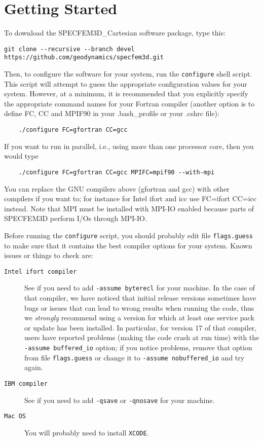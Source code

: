 \chapter{Getting Started}\label{cha:Getting-Started}

To download the SPECFEM3D\_Cartesian software package, type this:
\begin{verbatim}
git clone --recursive --branch devel https://github.com/geodynamics/specfem3d.git
\end{verbatim}
%

Then, to configure the software for your system, run the
\texttt{configure} shell script. This script will attempt to guess
the appropriate configuration values for your system. However, at
a minimum, it is recommended that you explicitly specify the appropriate
command names for your Fortran compiler (another option is to define FC, CC and MPIF90 in your .bash\_profile
or your .cshrc file):
%
\begin{verbatim}
    ./configure FC=gfortran CC=gcc
\end{verbatim}
%
If you want to run in parallel, i.e., using more than one processor core, then you would type
%
\begin{verbatim}
    ./configure FC=gfortran CC=gcc MPIFC=mpif90 --with-mpi
\end{verbatim}

You can replace the GNU compilers above (gfortran and gcc) with other compilers if you want to; for instance for Intel ifort and icc use FC=ifort CC=icc instead. Note that MPI must be installed with MPI-IO enabled because parts of SPECFEM3D perform I/Os through MPI-IO.

Before running the \texttt{configure} script, you should probably
edit file \texttt{flags.guess} to make sure that it contains the best
compiler options for your system. Known issues or things to check
are:
\begin{description}
\item [{\texttt{Intel ifort compiler}}] See if you need to add \texttt{-assume byterecl} for your machine. In the case of that compiler, we have noticed that initial release versions sometimes have bugs or issues that can lead to wrong results when running the code, thus we \emph{strongly} recommend using a version for which at least one service pack or update has been installed.
In particular, for version 17 of that compiler, users have reported problems (making the code crash at run time) with the \texttt{-assume buffered\_io} option; if you notice problems,
remove that option from file \texttt{flags.guess} or change it to \texttt{-assume nobuffered\_io} and try again.

\item [{\texttt{IBM compiler}}] See if you need to add \texttt{-qsave}
or \texttt{-qnosave} for your machine.

\item [{\texttt{Mac OS}}] You will probably need to install \texttt{XCODE}.
\end{description}

